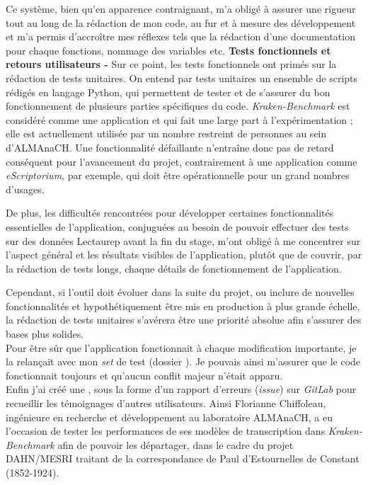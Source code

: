 Ce système, bien qu'en apparence contraignant, m'a obligé à assurer une rigueur tout au long de la rédaction de mon code, au fur et à mesure des développement et m'a permis d'accroître mes réflexes tels que la rédaction d'une documentation pour chaque fonctions, nommage des variables etc.
\newpage
\textbf{Tests fonctionnels et retours utilisateurs - } Sur ce point, les tests fonctionnels ont primés sur la rédaction de tests unitaires. On entend par tests unitaires un ensemble de scripts rédigés en langage Python, qui permettent de tester et de s'assurer du bon fonctionnement de plusieurs parties spécifiques du code.  \textit{Kraken-Benchmark} est considéré comme une application  et qui fait une large part à l'expérimentation ; elle est actuellement utilisée par un nombre restreint de personnes au sein d'ALMAnaCH. Une fonctionnalité défaillante n'entraîne donc pas de retard conséquent pour l'avancement du projet, contrairement à une application comme \textit{eScriptorium}, par exemple, qui doit être opérationnelle pour un grand nombres d'usages. 

De plus, les difficultés rencontrées pour développer certaines fonctionnalités essentielles de l'application, conjuguées au besoin de pouvoir effectuer des tests sur des données Lectaurep avant la fin du stage, m'ont obligé à me concentrer sur l'aspect général et les résultats visibles de l'application, plutôt que de couvrir, par la rédaction de tests longs, chaque détails de fonctionnement de l'application.

Cependant, si l'outil doit évoluer dans la suite du projet, ou inclure de nouvelles fonctionnalités et hypothétiquement être mis en production à plus grande échelle, la rédaction de tests unitaires s'avérera être une priorité absolue afin s'assurer des bases plus solides.\\

Pour être sûr que l'application fonctionnait à chaque modification importante, je la relançait avec mon \textit{set} de test (dossier ). Je pouvais ainsi m'assurer que le code fonctionnait toujours et qu'aucun conflit majeur n'était apparu.\\

Enfin j'ai créé une , sous la forme d'un rapport d'erreurs (\textit{issue}) sur \textit{GitLab} pour recueillir les témoignages d'autres utilisateurs. Ainsi Florianne Chiffoleau, ingénieure en recherche et développement au laboratoire  ALMAnaCH, a eu l'occasion de tester les performances de ses modèles de transcription dans \textit{Kraken-Benchmark} afin de pouvoir les départager, dans le cadre du projet DAHN/MESRI traitant de la correspondance de Paul d'Estournelles de Constant (1852-1924).\\

